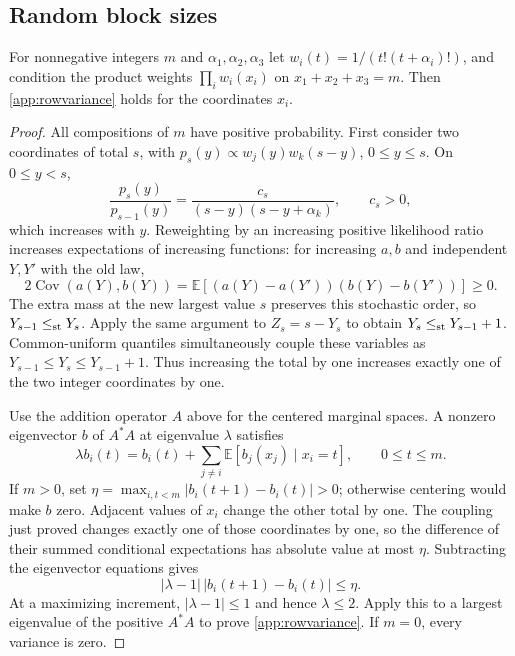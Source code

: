 \subsection{Random block sizes}
\begin{lemma}\label{app:counts}
For nonnegative integers $m$ and $\alpha_1,\alpha_2,\alpha_3$ let
$w_i(t)=1/(t!(t+\alpha_i)!)$, and condition the product weights
$\prod_iw_i(x_i)$ on $x_1+x_2+x_3=m$. Then \eqref{app:rowvariance} holds for
the coordinates $x_i$.
\end{lemma}
\begin{proof}
All compositions of $m$ have positive probability. First consider two
coordinates of total $s$, with $p_s(y)\propto w_j(y)w_k(s-y)$,
$0\le y\le s$. On $0\le y<s$,
\[
 \frac{p_s(y)}{p_{s-1}(y)}
 =\frac{c_s}{(s-y)(s-y+\alpha_k)},\qquad c_s>0,
\]
which increases with $y$. Reweighting by an increasing positive likelihood
ratio increases expectations of increasing functions: for increasing $a,b$
and independent $Y,Y'$ with the old law,
\[
 2\operatorname{Cov}(a(Y),b(Y))
 =\mathbb E[(a(Y)-a(Y'))(b(Y)-b(Y'))]\ge0.
\]
The extra mass at the new largest value $s$ preserves this stochastic order,
so $Y_{s-1}\le_{\rm st}Y_s$. Apply the same argument to $Z_s=s-Y_s$ to obtain
$Y_s\le_{\rm st}Y_{s-1}+1$. Common-uniform quantiles simultaneously couple
these variables as $Y_{s-1}\le Y_s\le Y_{s-1}+1$. Thus increasing the total
by one increases exactly one of the two integer coordinates by one.

Use the addition operator $A$ above for the centered marginal spaces.
A nonzero eigenvector $b$ of $A^*A$ at eigenvalue $\lambda$ satisfies
\[
 \lambda b_i(t)=b_i(t)+\sum_{j\ne i}\mathbb E[b_j(x_j)\mid x_i=t],
 \qquad 0\le t\le m.
\]
If $m>0$, set $\eta=\max_{i,t<m}|b_i(t+1)-b_i(t)|>0$; otherwise centering
would make $b$ zero. Adjacent values of $x_i$ change the other total by one.
The coupling just proved changes exactly one of those coordinates by one,
so the difference of their summed conditional expectations has absolute
value at most $\eta$. Subtracting the eigenvector equations gives
\[
 |\lambda-1|\,|b_i(t+1)-b_i(t)|\le\eta.
\]
At a maximizing increment, $|\lambda-1|\le1$ and hence $\lambda\le2$.
Apply this to a largest eigenvalue of the positive $A^*A$ to prove
\eqref{app:rowvariance}. If $m=0$, every variance is zero.
\end{proof}

